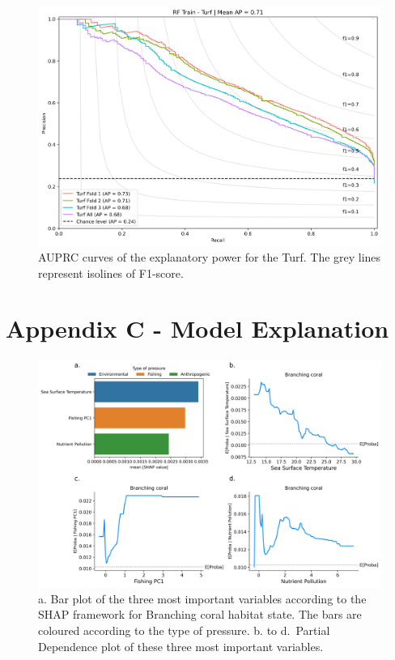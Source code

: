 \begin{figure}
\hypertarget{fig:chap3figS35}{%
\centering
\includegraphics{03-Chapitre3/figures/supplementary/03-precision_recall_curve_train_rf_Turf.png}
\caption{AUPRC curves of the explanatory power for the Turf. The grey
lines represent isolines of F1-score.}\label{fig:chap3figS35}
}
\end{figure}

\clearpage

\hypertarget{appendixC-chapter3}{%
\section*{Appendix C - Model Explanation}\label{appendixC-chapter3}}

\begin{figure}
\hypertarget{fig:chap3figS36}{%
\centering
\includegraphics{03-Chapitre3/figures/supplementary/04-pdp_Branching coral.png}
\caption{a. Bar plot of the three most important variables according to
the SHAP framework for Branching coral habitat state. The bars are
coloured according to the type of pressure. b. to d.~Partial Dependence
plot of these three most important variables.}\label{fig:chap3figS36}
}
\end{figure}

